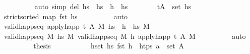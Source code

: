 \begin{isabellebody}
\ \ \ \ \ \ \ \ \isamarkupfalse%
\ {\isacharparenleft}{\kern0pt}auto\ simp\ del{\isacharcolon}{\kern0pt}\ {\isacartoucheopen}hs\ {\isacharequal}{\kern0pt}\ hs{}\ {\isacharat}{\kern0pt}\ h\ {\isacharhash}{\kern0pt}\ hs{}{\isacartoucheclose}{\isacharparenright}{\kern0pt}\isanewline
\ \ \ \ \ \ \isamarkupfalse%
\ {\isachardoublequoteopen}{\isacharparenleft}{\kern0pt}t{\isacharprime}{\kern0pt}{\isacharprime}{\kern0pt}{\isacharprime}{\kern0pt}{\isacharcomma}{\kern0pt}A{\isacharprime}{\kern0pt}{\isacharprime}{\kern0pt}{\isacharprime}{\kern0pt}{\isacharparenright}{\kern0pt}\ {\isasymin}\ set\ hs{}{\isachardoublequoteclose}\isanewline
\ \ \ \ \ \ \ \ \isamarkupfalse%
\ {\isacartoucheopen}strict{\isacharunderscore}{\kern0pt}sorted\ {\isacharparenleft}{\kern0pt}map\ fst\ hs{\isacharparenright}{\kern0pt}{\isacartoucheclose}\isanewline
\ \ \ \ \ \ \ \ \isamarkupfalse%
\ auto\isanewline
\ \ \ \ \ \ \isamarkupfalse%
\ \isamarkupfalse%
\ {\isachardoublequoteopen}valid{\isacharunderscore}{\kern0pt}happ{\isacharunderscore}{\kern0pt}seq\ {\isacharparenleft}{\kern0pt}apply{\isacharunderscore}{\kern0pt}happ\ {\isacharparenleft}{\kern0pt}t{\isacharcomma}{\kern0pt}\ A{\isacharprime}{\kern0pt}{\isacharparenright}{\kern0pt}\ M{\isacharparenright}{\kern0pt}\ {\isacharparenleft}{\kern0pt}hs{}\ {\isacharat}{\kern0pt}\ h{}\ {\isacharhash}{\kern0pt}\ hs{}{\isacharparenright}{\kern0pt}\ M{\isacharprime}{\kern0pt}{\isachardoublequoteclose}\isanewline
\ \ \ \ \ \ \ \ \isamarkupfalse%
\ {\isacartoucheopen}valid{\isacharunderscore}{\kern0pt}happ{\isacharunderscore}{\kern0pt}seq\ M\ hs\ M{\isacharprime}{\kern0pt}{\isacartoucheclose}\ {\isacartoucheopen}valid{\isacharunderscore}{\kern0pt}happ{\isacharunderscore}{\kern0pt}seq\ M\ {\isacharbrackleft}{\kern0pt}h{\isacharbrackright}{\kern0pt}\ {\isacharparenleft}{\kern0pt}apply{\isacharunderscore}{\kern0pt}happ\ {\isacharparenleft}{\kern0pt}t{\isacharcomma}{\kern0pt}\ A{\isacharprime}{\kern0pt}{\isacharparenright}{\kern0pt}\ M{\isacharparenright}{\kern0pt}{\isacartoucheclose}\isanewline
\ \ \ \ \ \ \ \ \isamarkupfalse%
\ auto\isanewline
\ \ \ \ \ \ \isamarkupfalse%
\ \isamarkupfalse%
\ {\isacharquery}{\kern0pt}thesis\isanewline
\ \ \ \ \ \ \ \ \isamarkupfalse%
\ {}{\isacharparenleft}{\kern0pt}{}{\isacharparenright}{\kern0pt}\ {\isacartoucheopen}{\isacharparenleft}{\kern0pt}{\isasymforall}h{\isasymin}set\ hs{}{\isachardot}{\kern0pt}\ fst\ h\ {\isasymnotin}\ htps{\isacharparenright}{\kern0pt}{\isacartoucheclose}\ {\isacartoucheopen}a\ {\isasymin}\ set\ A{\isacharprime}{\kern0pt}{\isacharprime}{\kern0pt}{\isacharprime}{\kern0pt}{\isacartoucheclose}\isanewline

\end{isabellebody}
